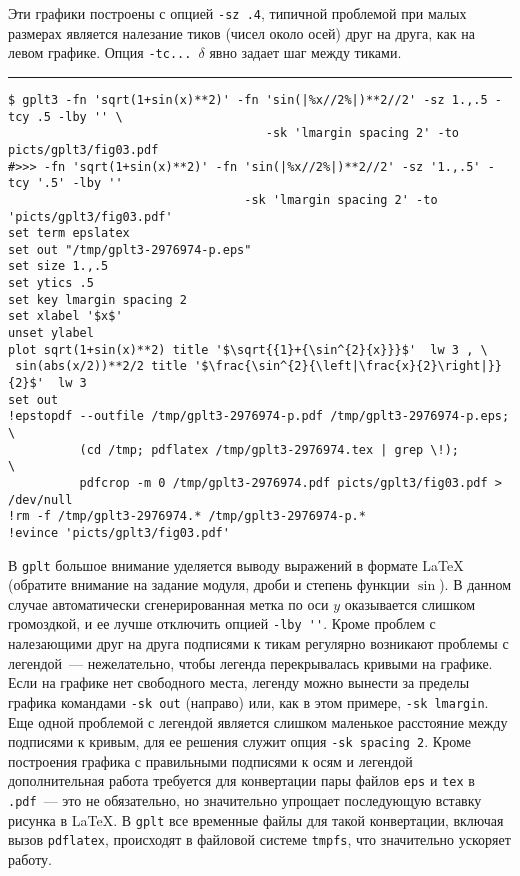 \documentclass[12pt]{article}
\def\gplt{{\tt gplt}}
\def\pdf{{\tt .pdf}}
\begin{document}
Эти графики построены с опцией \verb'-sz .4', типичной проблемой при малых размерах является налезание тиков (чисел около осей) друг на друга, как на левом графике.
Опция \verb'-tc... '$\delta$ явно задает шаг между тиками.\\

\hrule %

\vspace{3mm}
{\small
\begin{verbatim}
$ gplt3 -fn 'sqrt(1+sin(x)**2)' -fn 'sin(|%x//2%|)**2//2' -sz 1.,.5 -tcy .5 -lby '' \
                                    -sk 'lmargin spacing 2' -to picts/gplt3/fig03.pdf
#>>> -fn 'sqrt(1+sin(x)**2)' -fn 'sin(|%x//2%|)**2//2' -sz '1.,.5' -tcy '.5' -lby '' 
                                 -sk 'lmargin spacing 2' -to 'picts/gplt3/fig03.pdf'
set term epslatex 
set out "/tmp/gplt3-2976974-p.eps"
set size 1.,.5
set ytics .5
set key lmargin spacing 2
set xlabel '$x$'
unset ylabel
plot sqrt(1+sin(x)**2) title '$\sqrt{{1}+{\sin^{2}{x}}}$'  lw 3 , \
 sin(abs(x/2))**2/2 title '$\frac{\sin^{2}{\left|\frac{x}{2}\right|}}{2}$'  lw 3 
set out
!epstopdf --outfile /tmp/gplt3-2976974-p.pdf /tmp/gplt3-2976974-p.eps;        \
          (cd /tmp; pdflatex /tmp/gplt3-2976974.tex | grep \!);               \
          pdfcrop -m 0 /tmp/gplt3-2976974.pdf picts/gplt3/fig03.pdf > /dev/null
!rm -f /tmp/gplt3-2976974.* /tmp/gplt3-2976974-p.*
!evince 'picts/gplt3/fig03.pdf'
\end{verbatim}
  }
\begin{center}
\end{center}
В \gplt{} большое внимание уделяется выводу выражений в формате \LaTeX{} (обратите внимание на задание модуля, дроби и степень функции $\sin$).
В данном случае автоматически сгенерированная метка по оси $y$ оказывается слишком громоздкой, и ее лучше отключить опцией \verb|-lby ''|.
Кроме проблем с налезающими друг на друга подписями к тикам регулярно возникают проблемы с легендой~--- нежелательно, чтобы легенда
перекрывалась кривыми на графике. Если на графике нет свободного места, легенду можно вынести за пределы графика командами \verb'-sk out' (направо)
или, как в этом примере, \verb'-sk lmargin'. Еще одной проблемой с легендой является слишком маленькое расстояние между подписями к кривым,
для ее решения служит опция \verb'-sk spacing 2'. Кроме построения графика с правильными подписями к осям и легендой дополнительная работа
требуется для конвертации пары файлов \verb'eps' и \verb'tex' в \pdf~--- это не обязательно, но значительно упрощает последующую вставку рисунка
в \LaTeX. В \gplt{} все временные файлы для такой конвертации, включая вызов \verb'pdflatex', происходят в файловой системе \verb'tmpfs',
что значительно ускоряет работу.\\
\end{document}
